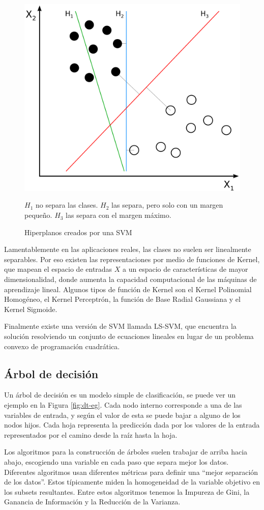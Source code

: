 \begin{figure}
    \centering
    \caption{Hiperplanos creados por una SVM}
    \label{fig:svm-hiperplanos}
    \includegraphics[width=0.6\linewidth]{graficos/svm_hiperplanos.png}
    \par
    \small
    $H_1$ no separa las clases. $H_2$ las separa, pero solo con un margen pequeño. $H_3$ las separa con el margen máximo.
\end{figure}

Lamentablemente en las aplicaciones reales, las clases no suelen ser linealmente separables. Por eso existen las representaciones por medio de funciones de Kernel, que mapean el espacio de entradas $X$ a un espacio de características de mayor dimensionalidad, donde aumenta la capacidad computacional de las máquinas de aprendizaje lineal. Algunos tipos de función de Kernel son el Kernel Polinomial Homogéneo, el Kernel Perceptrón, la función de Base Radial Gaussiana y el Kernel Sigmoide.

Finalmente existe una versión de \ac{SVM} llamada \ac{LS-SVM}, que encuentra la solución resolviendo un conjunto de ecuaciones lineales en lugar de un problema convexo de programación cuadrática.

\subsection{Árbol de decisión}

Un árbol de decisión es un modelo simple de clasificación, se puede ver un ejemplo en la Figura \ref{fig:dt-eg}. Cada nodo interno corresponde a una de las variables de entrada, y según el valor de esta se puede bajar a alguno de los nodos hijos. Cada hoja representa la predicción dada por los valores de la entrada representados por el camino desde la raíz hasta la hoja.

Los algoritmos para la construcción de árboles suelen trabajar de arriba hacia abajo, escogiendo una variable en cada paso que separa mejor los datos. Diferentes algoritmos usan diferentes métricas para definir una ``mejor separación de los datos''. Estos típicamente miden la homogeneidad de la variable objetivo en los subsets resultantes. Entre estos algoritmos tenemos la Impureza de Gini, la Ganancia de Información y la Reducción de la Varianza.

